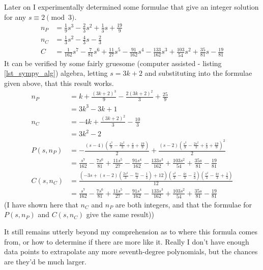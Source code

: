 Later on I experimentally determined some formulae that give an integer solution
for any \(s \equiv 2 \pmod 3\).
\begin{align*}
n_P &= \tfrac 19s^3 - \tfrac 23s^2 + \tfrac 13s + \tfrac{19}9 \\
n_C &= \tfrac 13s^2 - \tfrac 43s - \tfrac 23 \\
C &= \tfrac{1}{162}s^7 - \tfrac{7}{81}s^6 + \tfrac{11}{27}s^5 - \tfrac{91}{162}s^4
    - \tfrac{133}{162}s^3 + \tfrac{103}{54}s^2 + \tfrac{35}{81}s - \tfrac{19}{81}
\end{align*}
It can be verified by some fairly gruesome (computer assisted - listing
\ref{lst_sympy_alg}) algebra, letting \(s = 3k+2\) and substituting into the
formulae given above, that this result works.
\begin{align*}
n_P &= k + \frac{\left(3 k + 2\right)^{3}}{9} - \frac{2 \left(3 k + 2\right)^{2}}{3} + \frac{25}{9} \\
    &= 3 k^{3} - 3 k + 1 \\
n_C &= - 4 k + \frac{\left(3 k + 2\right)^{2}}{3} - \frac{10}{3} \\
    &= 3 k^{2} - 2 \\
P(s, n_P) &= - \frac{\left(s - 4\right) \left(\frac{s^{3}}{9} - \frac{2 s^{2}}{3} + \frac{s}{3} + \frac{19}{9}\right)}{2} + \frac{\left(s - 2\right) \left(\frac{s^{3}}{9} - \frac{2 s^{2}}{3} + \frac{s}{3} + \frac{19}{9}\right)^{2}}{2} \\[3ex]
          &= \frac{s^{7}}{162} - \frac{7 s^{6}}{81} + \frac{11 s^{5}}{27} - \frac{91 s^{4}}{162} - \frac{133 s^{3}}{162} + \frac{103 s^{2}}{54} + \frac{35 s}{81} - \frac{19}{81} \\[3ex]
C(s, n_C) &= \frac{\left(- 3 s + \left(s - 2\right) \left(\frac{2 s^{2}}{3} - \frac{8 s}{3} - \frac{1}{3}\right) + 12\right) \left(\frac{s^{2}}{3} - \frac{4 s}{3} - \frac{2}{3}\right) \left(\frac{s^{2}}{3} - \frac{4 s}{3} + \frac{1}{3}\right)}{12} \\[3ex]
          &= \frac{s^{7}}{162} - \frac{7 s^{6}}{81} + \frac{11 s^{5}}{27} - \frac{91 s^{4}}{162} - \frac{133 s^{3}}{162} + \frac{103 s^{2}}{54} + \frac{35 s}{81} - \frac{19}{81}
\end{align*}
(I have shown here that \(n_C\) and \(n_P\) are both integers, and that the
formulae for \(P(s, n_P)\) and \(C(s, n_C)\) give the same result))

It still remains utterly beyond my comprehension as to where this formula comes
from, or how to determine if there are more like it. Really I don't have enough
data points to extrapolate any more seventh-degree polynomials, but the chances
are they'd be much larger.

